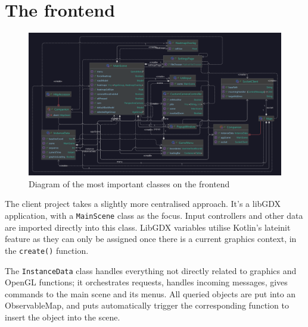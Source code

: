 \section{The frontend}

\begin{figure}[!ht]
    \centering
    \includegraphics[width=140mm, keepaspectratio]{images/frontend-classes.png}
    \caption{Diagram of the most important classes on the frontend}
\end{figure}

The client project takes a slightly more centralised approach. It's a libGDX application, with a \verb|MainScene| class as the focus. Input controllers and other data are imported directly into this class. LibGDX variables utilise Kotlin's lateinit feature as they can only be assigned once there is a current graphics context, in the \verb|create()| function.

The \verb|InstanceData| class handles everything not directly related to graphics and OpenGL functions; it orchestrates requests, handles incoming messages, gives commands to the main scene and its menus. All queried objects are put into an ObservableMap, and puts automatically trigger the corresponding function to insert the object into the scene.

